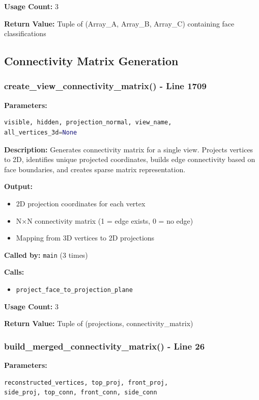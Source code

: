 \documentclass[11pt,a4paper]{article}
\begin{document}
\textbf{Usage Count:} 3

\textbf{Return Value:} Tuple of (Array\_A, Array\_B, Array\_C) containing face classifications

\subsection{Connectivity Matrix Generation}

\subsubsection{create\_view\_connectivity\_matrix() - Line 1709}
\textbf{Parameters:}
\begin{lstlisting}[language=Python]
visible, hidden, projection_normal, view_name, 
all_vertices_3d=None
\end{lstlisting}

\textbf{Description:}
Generates connectivity matrix for a single view. Projects vertices to 2D, identifies unique projected coordinates, builds edge connectivity based on face boundaries, and creates sparse matrix representation.

\textbf{Output:}
\begin{itemize}
    \item 2D projection coordinates for each vertex
    \item N×N connectivity matrix (1 = edge exists, 0 = no edge)
    \item Mapping from 3D vertices to 2D projections
\end{itemize}

\textbf{Called by:} \texttt{main} (3 times)

\textbf{Calls:}
\begin{itemize}
    \item \texttt{project\_face\_to\_projection\_plane}
\end{itemize}

\textbf{Usage Count:} 3

\textbf{Return Value:} Tuple of (projections, connectivity\_matrix)

\subsubsection{build\_merged\_connectivity\_matrix() - Line 26}
\textbf{Parameters:}
\begin{lstlisting}[language=Python]
reconstructed_vertices, top_proj, front_proj, 
side_proj, top_conn, front_conn, side_conn
\end{lstlisting}
\end{document}
